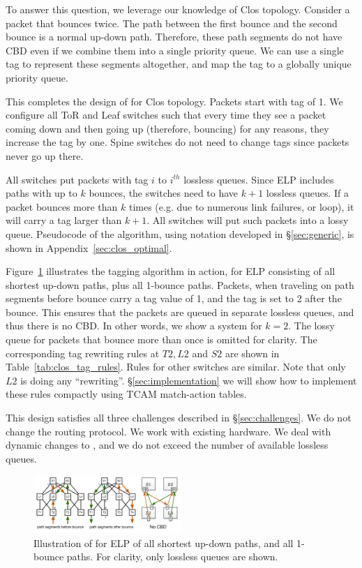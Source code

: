 To answer this question, we leverage our knowledge of Clos topology.  Consider a
packet that bounces twice. The path between the first bounce and the second
bounce is a normal up-down path. Therefore, these path segments do not have CBD
even if we combine them into a single priority queue. We can use a single tag to
represent these segments altogether, and map the tag to a globally unique
priority queue.

This completes the design of \sysname{} for Clos topology. Packets start with
tag of 1. We configure all ToR and Leaf switches such that every time they see
a packet coming down and then going up (therefore, bouncing) for any reasons,
they increase the tag by one. Spine switches do not need to change tags since 
packets never go up there.

All switches put packets with tag $i$ to $i^{th}$ lossless queues. Since ELP
includes paths with up to $k$ bounces, the switches need to have $k+1$ lossless
queues. If a packet bounces more than $k$ times (e.g. due to numerous link
failures, or loop), it will carry a tag larger than $k+1$. All switches will put
such packets into a lossy queue.  Pseudocode of the algorithm, using notation
developed in \S\ref{sec:generic}, is shown in Appendix~\ref{sec:clos_optimal}.

Figure~\ref{fig:clos_tagger} illustrates the tagging algorithm in action, for
ELP consisting of all shortest up-down paths, plus all 1-bounce paths.
Packets, when traveling on path segments before bounce carry a tag value of 1,
and the tag is set to 2 after the bounce. This ensures that the packets are
queued in separate lossless queues, and thus there is no CBD. In other words, we
show a system for $k=2$. The lossy queue for packets that bounce more than once
is omitted for clarity. The corresponding tag rewriting rules at  $T2, L2$ and
$S2$ are shown in Table~\ref{tab:clos_tag_rules}.  Rules for other switches are
similar. Note that only $L2$ is doing any ``rewriting''.
\S\ref{sec:implementation} we will show how to implement these rules compactly
using TCAM match-action tables.

This design satisfies all three challenges described in \S\ref{sec:challenges}.
We do not change the routing protocol. We work with existing hardware. We deal
with dynamic changes to , and we do not exceed the number of available
lossless queues.

\begin{figure}[t]
	\centering
	\includegraphics[width=0.5\textwidth] {figs/cbd_b}
	\caption{Illustration of \sysname{} for ELP of all shortest up-down paths,
		and all 1-bounce paths. For clarity, only lossless queues are shown.}
	\label{fig:clos_tagger}
\end{figure}

